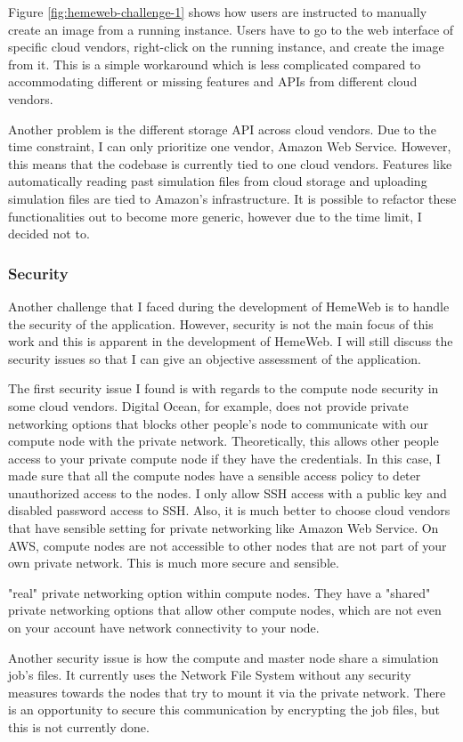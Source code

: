 \vspace{1cm}

Figure \ref{fig:hemeweb-challenge-1} shows how users are instructed to manually create an image from a running instance. Users have to go to the web interface of specific cloud vendors, right-click on the running instance, and create the image from it. This is a simple workaround which is less complicated compared to accommodating different or missing features and APIs from different cloud vendors.


Another problem is the different storage API across cloud vendors. Due to the time constraint, I can only prioritize one vendor, Amazon Web Service. However, this means that the codebase is currently tied to one cloud vendors. Features like automatically reading past simulation files from cloud storage and uploading simulation files are tied to Amazon's infrastructure. It is possible to refactor these functionalities out to become more generic, however due to the time limit, I decided not to.

\subsubsection{Security}

Another challenge that I faced during the development of HemeWeb is to handle the security of the application. However, security is not the main focus of this work and this is apparent in the development of HemeWeb. I will still discuss the security issues so that I can give an objective assessment of the application.

The first security issue I found is with regards to the compute node security in some cloud vendors. Digital Ocean, for example, does not provide private networking options that blocks other people's node to communicate with our compute node with the private network. Theoretically, this allows other people access to your private compute node if they have the credentials. In this case, I made sure that all the compute nodes have a sensible access policy to deter unauthorized access to the nodes. I only allow SSH access with a public key and disabled password access to SSH. Also, it is much better to choose cloud vendors that have sensible setting for private networking like Amazon Web Service. On AWS, compute nodes are not accessible to other nodes that are not part of your own private network. This is much more secure and sensible.


"real" private networking option within compute nodes. They have a "shared" private networking options that allow other compute nodes, which are not even on your account have network connectivity to your node. 


Another security issue is how the compute and master node share a simulation job's files. It currently uses the Network File System without any security measures towards the nodes that try to mount it via the private network. There is an opportunity to secure this communication by encrypting the job files, but this is not currently done.






